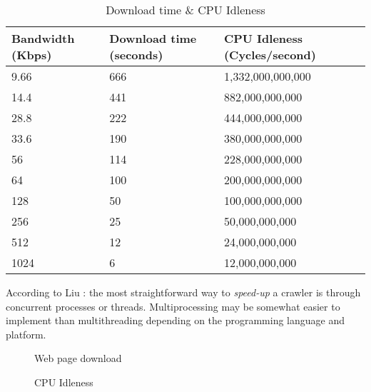 \begin{table}\centering
	\caption{Download time \& CPU Idleness}\label{tab:downloadIdleness}
   	\begin{tabular}{ | p{2.5cm\textwidth} | p{3cm\textwidth} | p{3.5cm\textwidth} |}
   	\hline
   	\textbf{Bandwidth (Kbps)}  & \textbf{Download time (seconds)} & \textbf{CPU Idleness (Cycles/second)}  \\ \hline

	9.66&666&1,332,000,000,000\\ \hline
	14.4&441&882,000,000,000\\ \hline
	28.8&222&444,000,000,000\\ \hline
	33.6&190&380,000,000,000\\ \hline
	56&114&228,000,000,000\\ \hline
	64&100&200,000,000,000\\ \hline
	128&50&100,000,000,000\\ \hline
	256&25&50,000,000,000\\ \hline
	512&12&24,000,000,000\\ \hline
	1024&6&12,000,000,000\\ \hline

    \end{tabular}
\end{table}

According to Liu \cite%
{L2011}: the most straightforward way to \emph{speed-up} a crawler is through concurrent processes or threads. Multiprocessing may be somewhat easier to implement than multithreading depending on the programming language and platform.

\begin{figure}\centering
	\caption{Web page download}\label{fig:Bandwidth}
\end{figure}


\begin{figure}\centering
	\caption{CPU Idleness}\label{fig:CPUIdleness}
\end{figure}

